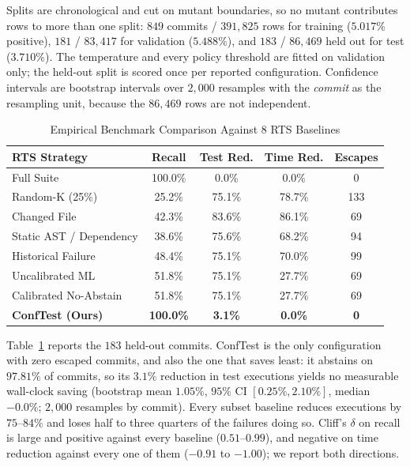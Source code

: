 \documentclass[sigconf,screen]{acmart}
\begin{document}
Splits are chronological and cut on mutant boundaries, so no mutant contributes rows to more than
one split: $849$ commits / $391{,}825$ rows for training ($5.017\%$ positive), $181$ / $83{,}417$
for validation ($5.488\%$), and $183$ / $86{,}469$ held out for test ($3.710\%$). The temperature
and every policy threshold are fitted on validation only; the held-out split is scored once per
reported configuration. Confidence intervals are bootstrap intervals over $2{,}000$ resamples with
the \emph{commit} as the resampling unit, because the $86{,}469$ rows are not independent.
\begin{table}[t]
\centering
\caption{Empirical Benchmark Comparison Against 8 RTS Baselines}
\label{tab:baselines}
\small
\begin{tabular}{lcccc}
\toprule
\textbf{RTS Strategy} & \textbf{Recall} & \textbf{Test Red.} & \textbf{Time Red.} & \textbf{Escapes} \\
\midrule
Full Suite & 100.0\% & 0.0\% & 0.0\% & 0 \\
Random-K (25\%) & 25.2\% & 75.1\% & 78.7\% & 133 \\
Changed File & 42.3\% & 83.6\% & 86.1\% & 69 \\
Static AST / Dependency & 38.6\% & 75.6\% & 68.2\% & 94 \\
Historical Failure & 48.4\% & 75.1\% & 70.0\% & 99 \\
Uncalibrated ML & 51.8\% & 75.1\% & 27.7\% & 69 \\
Calibrated No-Abstain & 51.8\% & 75.1\% & 27.7\% & 69 \\
\textbf{ConfTest (Ours)} & \textbf{100.0\%} & \textbf{3.1\%} & \textbf{0.0\%} & \textbf{0} \\
\bottomrule
\end{tabular}
\end{table}

Table~\ref{tab:baselines} reports the $183$ held-out commits. ConfTest is the only configuration with zero escaped commits, and also the one that saves least: it abstains on $97.81\%$ of commits, so its $3.1\%$ reduction in test executions yields no measurable wall-clock saving (bootstrap mean $1.05\%$, $95\%$ CI $[0.25\%, 2.10\%]$, median $-0.0\%$; $2{,}000$ resamples by commit). Every subset baseline reduces executions by $75$--$84\%$ and loses half to three quarters of the failures doing so. Cliff's $\delta$ on recall is large and positive against every baseline ($0.51$--$0.99$), and negative on time reduction against every one of them ($-0.91$ to $-1.00$); we report both directions.
\end{document}
